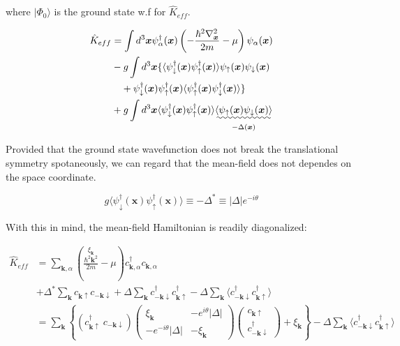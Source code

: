 ﻿\documentclass[twoside]{book}
\numberwithin{equation}{section}
\begin{document}
where $|\Phi_0\rangle$ is the ground state w.f for $\hat{K}_{eff}$. 

\[
\begin{split}
\hat{K}_{eff}&=\int d^3\bm{x}\psi_\alpha^\dagger(\bm{x})\left(-\frac{\hbar^2\nabla_{\bm{x}}^2}{2m}-\mu\right)\psi_\alpha(\bm{x})\\
&-g\int d^3\bm{x}\{\langle\psi_\downarrow^\dagger(\bm{x})\psi_\uparrow^\dagger(\bm{x})\rangle \psi_\uparrow(\bm{x})\psi_\downarrow(\bm{x})\\
&\quad+\psi_\downarrow^\dagger(\bm{x})\psi_\uparrow^\dagger(\bm{x}) \langle\psi_\uparrow^\dagger(\bm{x})\psi_\downarrow^\dagger(\bm{x})\rangle\}\\
&+g\int d^3\bm{x}\langle\psi_\downarrow^\dagger(\bm{x})\psi_\uparrow^\dagger(\bm{x})\rangle \underset{-\Delta(\bm{x})}{\uwave{\langle\psi_\uparrow(\bm{x})\psi_\downarrow(\bm{x})\rangle}}
\end{split}
 \]

Provided that the ground state wavefunction does not break the translational symmetry spotaneously, we can regard that the mean-field does not dependes on the space coordinate. 

\[g\langle\psi_\downarrow^\dagger(\bm{x})\psi_\uparrow^\dagger(\bm{x})\rangle \equiv-\Delta^*\equiv|\Delta|e^{-i\theta} \]

With this in mind, the mean-field Hamiltonian is readily diagonalized:

\[\begin{split}
\hat{K}_{eff} &=\sum_{\bm{k}, \alpha}\left(\overset{\xi_{\bm{k}}}{\frac{\hbar^2\bm{k}^2}{2m}}-\mu\right)c_{\bm{k},\alpha}^\dagger c_{\bm{k},\alpha}\\
&+\Delta^* \sum_{\bm{k}} c_{\bm{k}\uparrow}c_{-\bm{k}\downarrow}+ \Delta\sum_{\bm{k}}c_{-\bm{k}\downarrow}^\dagger c_{\bm{k}\uparrow}^\dagger - \Delta\sum_{\bm{k}}\langle c_{-\bm{k}\downarrow}^\dagger c_{\bm{k}\uparrow}^\dagger\rangle\\
&=\sum_{\bm{k}}\left\{(c_{\bm{k}\uparrow}^\dagger\  c_{-\bm{k}\downarrow}) \left(\begin{matrix}
\xi_{\bm{k}} & -e^{i\theta}|\Delta|\\
-e^{-i\theta}|\Delta| & -\xi_{\bm{k}}
\end{matrix}\right)
\left(\begin{matrix}
c_{\bm{k}\uparrow}\\
c_{-\bm{k}\downarrow}^\dagger
\end{matrix}\right)+\xi_{\bm{k}}\right\}-\Delta\sum_{\bm{k}}\langle c_{-\bm{k}\downarrow}^\dagger c_{\bm{k}\uparrow}^\dagger\rangle
\end{split} \]
\end{document}
